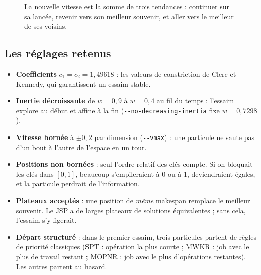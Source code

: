 \documentclass[11pt,a4paper]{article}
\begin{document}
\begin{figure}[h]
\centering
{}
\caption{La nouvelle vitesse est la somme de trois tendances : continuer sur sa lancée,
revenir vers son meilleur souvenir, et aller vers le meilleur de ses voisins.}
\label{fig:vitesse}
\end{figure}

\subsection{Les réglages retenus}

\begin{itemize}
  \item \textbf{Coefficients} $c_1=c_2=1{,}49618$ : les valeurs de \og constriction \fg{} de
        Clerc et Kennedy, qui garantissent un essaim stable.
  \item \textbf{Inertie décroissante} de $w=0{,}9$ à $w=0{,}4$ au fil du temps : l'essaim
        explore au début et affine à la fin (\texttt{-{}-no-decreasing-inertia} fixe
        $w=0{,}7298$).
  \item \textbf{Vitesse bornée} à $\pm0{,}2$ par dimension (\texttt{-{}-vmax}) : une particule
        ne saute pas d'un bout à l'autre de l'espace en un tour.
  \item \textbf{Positions non bornées} : seul l'ordre relatif des clés compte. Si on
        bloquait les clés dans $[0,1]$, beaucoup s'empileraient à 0 ou à 1, deviendraient
        égales, et la particule perdrait de l'information.
  \item \textbf{Plateaux acceptés} : une position de \emph{même} makespan remplace le
        meilleur souvenir. Le JSP a de larges plateaux de solutions équivalentes ; sans
        cela, l'essaim s'y figerait.
  \item \textbf{Départ structuré} : dans le premier essaim, trois particules partent de
        règles de priorité classiques (SPT : opération la plus courte ; MWKR : job avec le
        plus de travail restant ; MOPNR : job avec le plus d'opérations restantes). Les
        autres partent au hasard.
\end{itemize}
\end{document}
